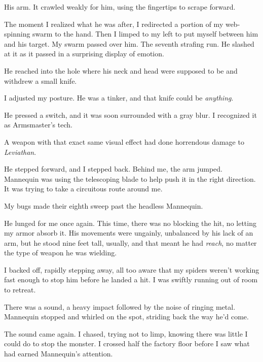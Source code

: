 His arm.  It crawled weakly for him, using the fingertips to scrape forward.



The moment I realized what he was after, I redirected a portion of my web-spinning swarm to the hand.  Then I limped to my left to put myself between him and his target.  My swarm passed over him.  The seventh strafing run.  He slashed at it as it passed in a surprising display of emotion.



He reached into the hole where his neck and head were supposed to be and withdrew a small knife.



I adjusted my posture.  He was a tinker, and that knife could be \emph{anything}.



He pressed a switch, and it was soon surrounded with a gray blur.  I recognized it as Armsmaster's tech.



A weapon with that exact same visual effect had done horrendous damage to \emph{Leviathan}.



He stepped forward, and I stepped back.  Behind me, the arm jumped.  Mannequin was using the telescoping blade to help push it in the right direction.  It was trying to take a circuitous route around me.



My bugs made their eighth sweep past the headless Mannequin.



He lunged for me once again.  This time, there was no blocking the hit, no letting my armor absorb it.  His movements were ungainly, unbalanced by his lack of an arm, but he stood nine feet tall, usually, and that meant he had \emph{reach}, no matter the type of weapon he was wielding.



I backed off, rapidly stepping away, all too aware that my spiders weren't working fast enough to stop him before he landed a hit.  I was swiftly running out of room to retreat.



There was a sound, a heavy impact followed by the noise of ringing metal.  Mannequin stopped and whirled on the spot, striding back the way he'd come.



The sound came again.  I chased, trying not to limp, knowing there was little I could do to stop the monster.  I crossed half the factory floor before I saw what had earned Mannequin's attention.



